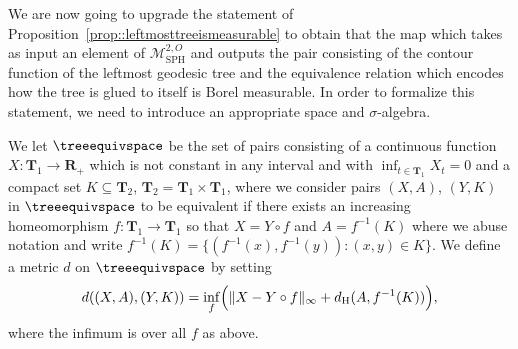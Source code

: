 \documentclass[10pt]{amsart}
\let\mathcal\mathscr
\theoremstyle{plain}
\numberwithin{theorem}{section}
\theoremstyle{definition}
\newcommand\gmsspace{{\mathcal M}_{\mathrm{SPH}}}
\newcommand{\R}{\mathbf{R}}
\newcommand{\T}{\mathbf{T}}
\renewcommand{\dh}{d_{\mathrm{H}}}
\begin{document}
We are now going to upgrade the statement of Proposition~\ref{prop::leftmosttreeismeasurable} to obtain that the map which takes as input an element of $\gmsspace^{2,O}$ and outputs the pair consisting of the contour function of the leftmost geodesic tree and the equivalence relation which encodes how the tree is glued to itself is Borel measurable. In order to formalize this statement, we need to introduce an appropriate space and $\sigma$-algebra.

We let $\treeequivspace$ be the set of pairs consisting of a continuous function $X \colon \T_1 \to \R_+$ which is not constant in any interval and with $\inf_{t \in \T_1} X_t = 0$ and a compact set $K \subseteq \T_2$, $\T_2 = \T_1 \times \T_1$, where we consider pairs $(X,A)$, $(Y,K)$ in $\treeequivspace$ to be equivalent if there exists an increasing homeomorphism $f \colon \T_1 \to \T_1$ so that $X = Y \circ f$ and $A = f^{-1}(K)$ where we abuse notation and write $f^{-1}(K) = \{(f^{-1}(x),f^{-1}(y)) : (x,y) \in K\}$. We define a metric $d$ on $\treeequivspace$ by setting
\[
d((X,A),(Y,K)) = \inf_f \Bigl( \| X - Y \circ f\|_\infty + \dh(A,f^{-1}(K)) \Bigr),
\]
where the infimum is over all $f$ as above.
\end{document}
